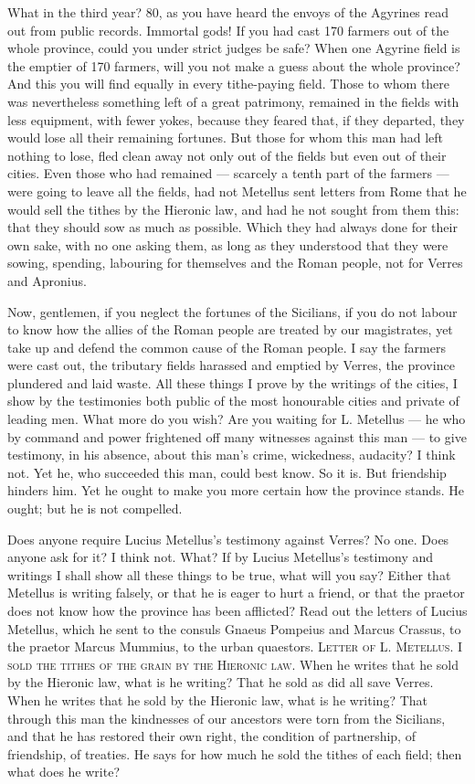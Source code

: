  What in the third year? 80, as you have heard the envoys of the Agyrines read out from public records. Immortal gods! If you had cast 170 farmers out of the whole province, could you under strict judges be safe? When one Agyrine field is the emptier of 170 farmers, will you not make a guess about the whole province? And this you will find equally in every tithe-paying field. Those to whom there was nevertheless something left of a great patrimony, remained in the fields with less equipment, with fewer yokes, because they feared that, if they departed, they would lose all their remaining fortunes. But those for whom this man had left nothing to lose, fled clean away not only out of the fields but even out of their cities. Even those who had remained --- scarcely a tenth part of the farmers --- were going to leave all the fields, had not Metellus sent letters from Rome that he would sell the tithes by the Hieronic law, and had he not sought from them this: that they should sow as much as possible. Which they had always done for their own sake, with no one asking them, as long as they understood that they were sowing, spending, labouring for themselves and the Roman people, not for Verres and Apronius.

 Now, gentlemen, if you neglect the fortunes of the Sicilians, if you do not labour to know how the allies of the Roman people are treated by our magistrates, yet take up and defend the common cause of the Roman people. I say the farmers were cast out, the tributary fields harassed and emptied by Verres, the province plundered and laid waste. All these things I prove by the writings of the cities, I show by the testimonies both public of the most honourable cities and private of leading men. What more do you wish? Are you waiting for L. Metellus --- he who by command and power frightened off many witnesses against this man --- to give testimony, in his absence, about this man's crime, wickedness, audacity? I think not. Yet he, who succeeded this man, could best know. So it is. But friendship hinders him. Yet he ought to make you more certain how the province stands. He ought; but he is not compelled.

 Does anyone require Lucius Metellus's testimony against Verres? No one. Does anyone ask for it? I think not. What? If by Lucius Metellus's testimony and writings I shall show all these things to be true, what will you say? Either that Metellus is writing falsely, or that he is eager to hurt a friend, or that the praetor does not know how the province has been afflicted? Read out the letters of Lucius Metellus, which he sent to the consuls Gnaeus Pompeius and Marcus Crassus, to the praetor Marcus Mummius, to the urban quaestors. \textsc{Letter of L. Metellus. I sold the tithes of the grain by the Hieronic law}. When he writes that he sold by the Hieronic law, what is he writing? That he sold as did all save Verres. When he writes that he sold by the Hieronic law, what is he writing? That through this man the kindnesses of our ancestors were torn from the Sicilians, and that he has restored their own right, the condition of partnership, of friendship, of treaties. He says for how much he sold the tithes of each field; then what does he write?

